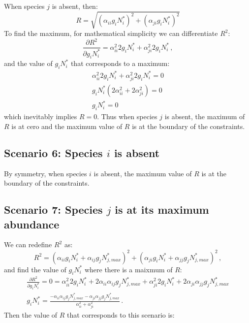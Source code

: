 \begin{refsection}
When species $j$ is absent, then:
\begin{equation}
  R = \sqrt{ (\alpha_{ii}g_{i}N_{i}^{*})^{2} + (\alpha_{ji}g_{i}N_{i}^{*})^{2}  }
\end{equation}
To find the maximum, for mathematical simplicity we can differentiate $R^{2}$:
\begin{equation}
  \frac{\partial R^{2}}{\partial g_{i}N_{i}^{*}} = \alpha_{ii}^{2}2g_{i}N_{i}^{*} + \alpha_{ji}^{2}2g_{i}N_{i}^{*} \,,
\end{equation}
and the value of $g_{i}N_{i}^{*}$ that corresponds to a maximum:
\begin{eqnarray}
  \alpha_{ii}^{2}2g_{i}N_{i}^{*} + \alpha_{ji}^{2}2g_{i}N_{i}^{*}  = 0 \\
  g_{i}N_{i}^{*} (2\alpha_{ii}^{2} +  2\alpha_{ji}^{2}) = 0 \\
  g_{i}N_{i}^{*}= 0
\end{eqnarray}
which inevitably implies $R = 0$. Thus when species $j$ is absent, the maximum of $R$ is at cero and the maximum value of $R$ is at the boundary of the constraints.



\subsection*{Scenario 6: Species $i$ is absent }
By symmetry, when species $i$ is absent, the maximum value of $R$ is  at the boundary of the constraints.

\subsection*{Scenario 7: Species $j$ is at its maximum abundance }
We can redefine $R^{2}$ as:
\begin{equation}
   R^2 = (\alpha_{ii}g_{i}N_{i}^{*} + \alpha_{ij}g_{j}N_{j,max}^{*} )^2 + (\alpha_{ji}g_{i}N_{i}^{*} + \alpha_{jj}g_{j}N_{j,max}^{*} )^2 \,,
\end{equation}
and find the value of $g_{i}N_{i}^{*}$ where there is a maixmum of $R$:
\begin{eqnarray}
  \frac{\partial R^{2}}{\partial g_{i}N_{i}^{*}}= 0 = \alpha_{ii}^{2}2g_{i}N_{i}^{*}  +2\alpha_{ii}\alpha_{ij}g_{j}N_{j,max}^{*} +  \alpha_{ji}^{2}2g_{i}N_{i}^{*} + 2\alpha_{ji}\alpha_{jj}g_{j}N_{j,max}^{*}\\
  g_{i}N_{i}^{*} = \frac{- \alpha_{ii}\alpha_{ij}g_{j}N_{j,max}^{*} - \alpha_{ji}\alpha_{jj}g_{j}N_{j,max}^{*}}{\alpha_{ii}^2 + \alpha_{ji}^2} \,.
\end{eqnarray}
Then the value of $R$ that corresponds to this scenario is:


\end{refsection}
